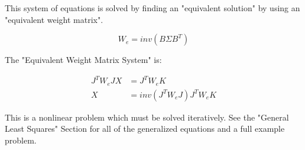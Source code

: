 This system of equations is solved by finding an "equivalent solution" by using an "equivalent weight matrix".

\[
W_e = inv(B \Sigma B^T)
\]

The "Equivalent Weight Matrix System" is:

\begin{align*}
J^TW_eJX &= J^TW_eK \\
X &= inv(J^TW_eJ)J^TW_eK 
\end{align*}

This is a nonlinear problem which must be solved iteratively.  See the "General Least Squares" Section for all of the generalized equations and a full example problem.